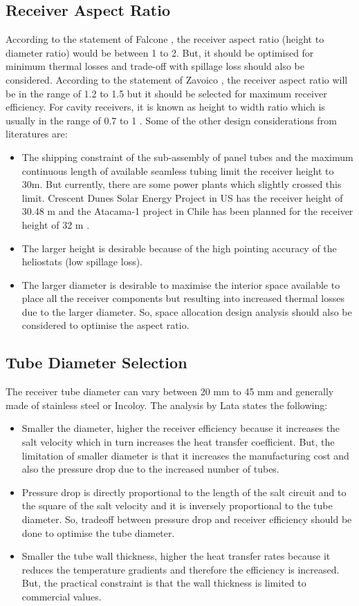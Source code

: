 \subsection{Receiver Aspect Ratio}
According to the statement of Falcone \cite{Falcone.1986}, the receiver aspect ratio (height to diameter ratio) would be between 1 to 2. But, it should be optimised for minimum thermal losses and trade-off with spillage loss should also be considered. According to the statement of Zavoico \cite{Zavoico.2001}, the receiver aspect ratio will be in the range of 1.2 to 1.5 but it should be selected for maximum receiver efficiency. For cavity receivers, it is known as height to width ratio which is usually in the range of 0.7 to 1 \cite{Falcone.1986}. Some of the other design considerations from literatures \cite{Falcone.1986} \cite{Zavoico.2001} are:
\begin{itemize}
	\item  The shipping constraint of the sub-assembly of panel tubes and the maximum continuous length of available seamless tubing limit the receiver height to 30m. But currently, there are some power plants which slightly crossed this limit. Crescent Dunes Solar Energy Project in US has the receiver height of 30.48 m \cite{Crescent} and the Atacama-1 project in Chile has been planned for the receiver height of 32 m \cite{Atacama}. 
	\item The larger height is desirable because of the high pointing accuracy of the heliostats (low spillage loss). 
	\item The larger diameter is desirable to maximise the interior space available to place all the receiver components but resulting into increased thermal losses due to the larger diameter. So, space allocation design analysis should also be considered to optimise the aspect ratio.
\end{itemize} 
\subsection{Tube Diameter Selection}
The receiver tube diameter can vary between 20 mm to 45 mm \cite{Lata.2008} and generally made of stainless steel or Incoloy. The analysis by Lata \cite{Lata.2008} states the following: 
\begin{itemize}
	\item Smaller the diameter, higher the receiver efficiency because it increases the salt velocity which in turn increases the heat transfer coefficient. But, the limitation of smaller diameter is that it increases the manufacturing cost and also the pressure drop due to the increased number of tubes.
	\item Pressure drop is directly proportional to the length of the salt circuit and to the square of the salt velocity and it is inversely proportional to the tube diameter. So, tradeoff between pressure drop and receiver efficiency should be done to optimise the tube diameter.
	\item Smaller the tube wall thickness, higher the heat transfer rates because it reduces the temperature gradients and therefore the efficiency is increased. But, the practical constraint is that the wall thickness is limited to commercial values.
\end{itemize}
